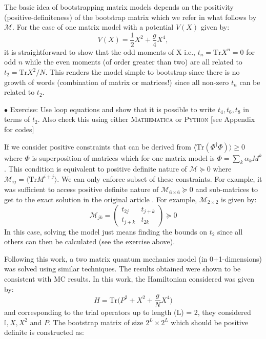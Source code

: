 \documentclass[11pt]{article}
\newcommand{\MA}{\textsc{Mathematica }}
\newcommand{\PY}{\textsc{Python }}
\begin{document}
The basic idea of bootstrapping matrix models depends on the 
positivity (positive-definiteness) of the bootstrap matrix which we refer in what follows 
by $\mathcal{M}$. For the case of one matrix model with a potential $V(X)$ given by: 
\begin{equation}
    V(X) = \frac12 X^2 + \frac{g}{4} X^4, 
\end{equation}
it is straightforward to show that the odd moments of X i.e., $ t_{n} = \mbox{Tr} X^n = 0$ for odd $n$
while the even moments (of order greater than two) are all related to $t_{2} = \mbox{Tr} X^2/N$. This renders the 
model simple to bootstrap since there is no growth of words (combination of matrix or matrices!)
since all non-zero $t_{n}$ can be related to $t_{2}$. 
\begin{mdframed}[backgroundcolor=blue!3] 
	\textsc{} 
	$\bullet$ Exercise: Use loop equations and show that it is possible to write $t_{4}, t_{6}, t_{8}$ in terms of $t_{2}$. Also check this using either \MA or \PY [see Appendix for codes] 
\end{mdframed} 
If we consider positive constraints that can be derived from $\langle \mbox{Tr}(\Phi^{\dagger}\Phi) \rangle \ge 0 $
where $\Phi$ is superposition of matrices which for one matrix model is 
$ \Phi = \sum_{k} \alpha_{k} M^{k}$. This condition is equivalent to positive definite nature of
$\mathcal{M} \succeq 0 $ where $ \mathcal{M}_{ij} = \langle \mbox{Tr} M^{i+j} \rangle$. 
We can only enforce subset of these constraints. For example, it was sufficient to 
access positive definite nature of $\mathcal{M}_{6 \times 6} \succeq 0 $ and sub-matrices 
to get to the exact solution in the original article \cite{Lin:2020mme}. 
For example, $\mathcal{M}_{2 \times 2}$ is given by:
\begin{equation}
	\mathcal{M}_{jk} = 
	\begin{pmatrix}
		t_{2j} & t_{j+k}  \\
		t_{j+k} & t_{2k}  
	\end{pmatrix}  \succeq 0
\end{equation}
In this case, solving the model just means finding the bounds on $t_{2}$ since all others can then be calculated (see the exercise above). 

Following this work, a two matrix quantum mechanics 
model (in 0+1-dimensions) was solved using similar techniques. 
The results obtained were shown to be consistent with MC results. 
In this work, the Hamiltonian considered was given by:
\begin{equation}
H = \mbox{Tr} \Big( P^2 + X^2 + \frac{g}{N} X^4 \Big)
\end{equation}
and corresponding to the trial operators up to length (L) = 2, 
they considered $ \mathbb{I}, X, X^{2}$ and $P$. The bootstrap matrix
of size $2^L \times 2^L$ which should be positive definite is constructed as:
\end{document}
